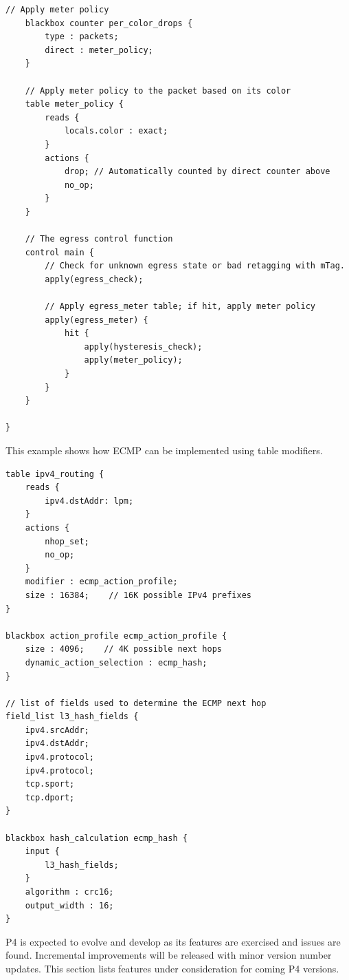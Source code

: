 \documentclass[12pt]{article}
\begin{document}
\begin{lstlisting}[style=P4style]
    // Apply meter policy
    blackbox counter per_color_drops {
        type : packets;
        direct : meter_policy;
    }

    // Apply meter policy to the packet based on its color
    table meter_policy {
        reads {
            locals.color : exact;
        }
        actions {
            drop; // Automatically counted by direct counter above
            no_op;
        }
    }

    // The egress control function
    control main {
        // Check for unknown egress state or bad retagging with mTag.
        apply(egress_check);

        // Apply egress_meter table; if hit, apply meter policy
        apply(egress_meter) {
            hit {
                apply(hysteresis_check);
                apply(meter_policy);
            }
        }
    }

}
\end{lstlisting}



This example shows how ECMP can be implemented using table modifiers.

\begin{lstlisting}[style=P4style]
table ipv4_routing {
    reads {
        ipv4.dstAddr: lpm;
    }
    actions {
        nhop_set;
        no_op;
    }
    modifier : ecmp_action_profile;
    size : 16384;    // 16K possible IPv4 prefixes
}

blackbox action_profile ecmp_action_profile {
    size : 4096;    // 4K possible next hops
    dynamic_action_selection : ecmp_hash;
}

// list of fields used to determine the ECMP next hop
field_list l3_hash_fields {
    ipv4.srcAddr;
    ipv4.dstAddr;
    ipv4.protocol;
    ipv4.protocol;
    tcp.sport;
    tcp.dport;
}

blackbox hash_calculation ecmp_hash {
    input {
        l3_hash_fields;
    }
    algorithm : crc16;
    output_width : 16;
}

\end{lstlisting}



P4 is expected to evolve and develop as its features are exercised and issues 
are found. Incremental improvements will be released with minor version number 
updates. This section lists features under consideration for coming P4 versions.
\end{document}
